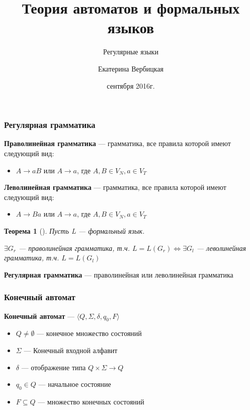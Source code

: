 \documentclass{beamer}
\title[]{Теория автоматов и формальных языков}
\subtitle[]{Регулярные языки}
\institute[]{
Санкт-Петербургский государственный электротехнический университет <<ЛЭТИ>>\\
}
\author[]{Екатерина Вербицкая}
\date{ сентября 2016г.}
\newtheorem{rutheorem}{Теорема}
\begin{document}
{
  \begin{frame}
    \titlepage
  \end{frame}
}

\begin{frame}[fragile]
  \transwipe[direction=90]
  \frametitle{Регулярная грамматика}
  \textbf{Праволинейная грамматика} --- грамматика, все правила которой имеют следующий вид:
  \begin{itemize}
    \item $A \rightarrow a B$ или $A \rightarrow a$, где $A, B \in V_N, a \in V_T$
  \end{itemize}


  \textbf{Леволинейная грамматика} --- грамматика, все правила которой имеют следующий вид:
  \begin{itemize}
    \item $A \rightarrow B a$ или $A \rightarrow a$, где $A, B \in V_N, a \in V_T$
  \end{itemize}

\pause 

  \begin{rutheorem}[]
    Пусть L --- формальный язык. 

    $\exists G_r$ --- праволинейная грамматика, т.ч. $L = L(G_r) \Leftrightarrow \exists G_l$ --- леволинейная грамматика, т.ч. $L = L(G_l) $
  \end{rutheorem}
\pause
  \textbf{Регулярная грамматика} --- праволинейная или леволинейная грамматика
\end{frame}

\begin{frame}[fragile]
  \transwipe[direction=90]
  \frametitle{Конечный автомат}
  \textbf{Конечный автомат} --- $\langle Q, \Sigma, \delta, q_0, F \rangle$
  \begin{itemize}
    \item $Q \neq \emptyset$ --- конечное множество состояний
    \item $\Sigma$ --- Конечный входной алфавит
    \item $\delta$ --- отображение типа $Q \times \Sigma \rightarrow Q$
    \item $q_0 \in Q$ --- начальное состояние
    \item $F \subseteq Q$ --- множество конечных состояний
  \end{itemize}
\end{frame}
\end{document}
